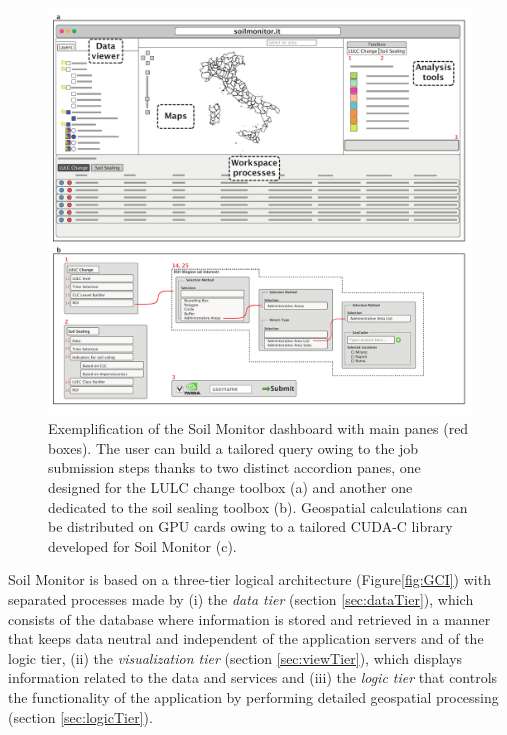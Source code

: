 \documentclass[APA,LATO1COL,doublespace]{WileyNJD-v2}
\begin{document}
\begin{figure}[t] %
    \centerline{\includegraphics[width=500pt]{daMileti/01_piattaforma.pdf}}
    \caption{Exemplification of the Soil Monitor dashboard with main panes (red boxes). 
    The user can build a tailored query owing to the job submission steps thanks to two distinct accordion panes, one designed for the LULC change toolbox (a) and another one dedicated to the soil sealing toolbox (b). 
    Geospatial calculations can be distributed on GPU cards owing to a tailored CUDA-C library developed for Soil Monitor (c). } \label{fig:SMapp}
\end{figure}

Soil Monitor is based on a three-tier logical architecture (Figure\ref{fig:GCI}) with separated processes made by 
(i) 
the \textit{data tier} (section \ref{sec:dataTier}), which consists of the database where information is stored and retrieved in a manner that keeps data neutral and independent of the application servers and of the logic tier,
(ii) the \textit{visualization tier} (section \ref{sec:viewTier}), which displays information related to the data and services
and 
(iii) 
the \textit{logic tier} that controls the functionality of the application by performing detailed geospatial processing (section \ref{sec:logicTier}).
\end{document}

